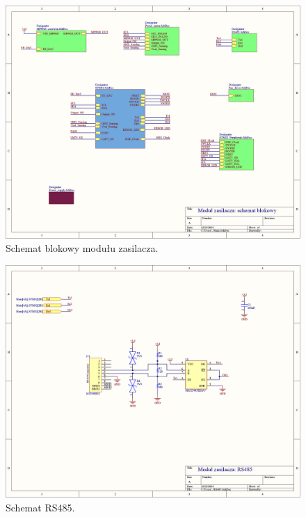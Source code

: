 \begin{figure}
    \begin{center}
        \includegraphics[width = 21cm]{zalaczniki/zasilacz/Zasilacz_regulowany_Strona_01.jpg}
        \caption{Schemat blokowy modułu zasilacza.}
    \end{center}
\end{figure}

\begin{figure}
    \begin{center}
        \includegraphics[width = 21cm]{zalaczniki/zasilacz/Zasilacz_regulowany_Strona_02.jpg}
        \caption{Schemat RS485.}
    \end{center}
\end{figure}

